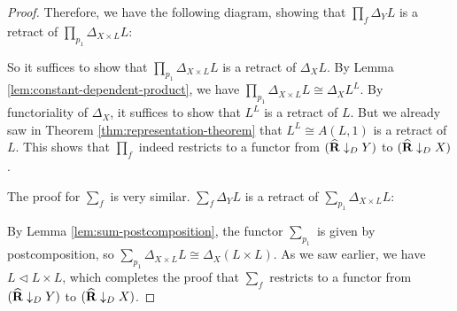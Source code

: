 \begin{proof}
  Therefore, we have the following diagram, showing that $ \prod_f \Delta_Y L $ is a retract of $ \prod_{p_1} \Delta_{X \times L} L $:
  \begin{center}
  \end{center}
  So it suffices to show that $ \prod_{p_1} \Delta_{X \times L} L $ is a retract of $ \Delta_X L $. By Lemma \ref{lem:constant-dependent-product}, we have $ \prod_{p_1} \Delta_{X \times L} L \cong \Delta_X L^L $. By functoriality of $ \Delta_X $, it suffices to show that $ L^L $ is a retract of $ L $. But we already saw in Theorem \ref{thm:representation-theorem} that $ L^L \cong A(L, 1) $ is a retract of $ L $. This shows that $ \prod_f $ indeed restricts to a functor from $ (\widehat {\mathbf{R}} \downarrow_D Y) $ to $ (\widehat {\mathbf{R}} \downarrow_D X) $.

  The proof for $ \sum_f $ is very similar. $ \sum_f \Delta_Y L $ is a retract of $ \sum_{p_1} \Delta_{X \times L} L $:
  \begin{center}
  \end{center}
  By Lemma \ref{lem:sum-postcomposition}, the functor $ \sum_{p_1} $ is given by postcomposition, so $ \sum_{p_1} \Delta_{X \times L} L \cong \Delta_X (L \times L) $. As we saw earlier, we have $ L \triangleleft L \times L $, which completes the proof that $ \sum_f $ restricts to a functor from $ (\widehat {\mathbf{R}} \downarrow_D Y) $ to $ (\widehat {\mathbf{R}} \downarrow_D X) $.
\end{proof}

